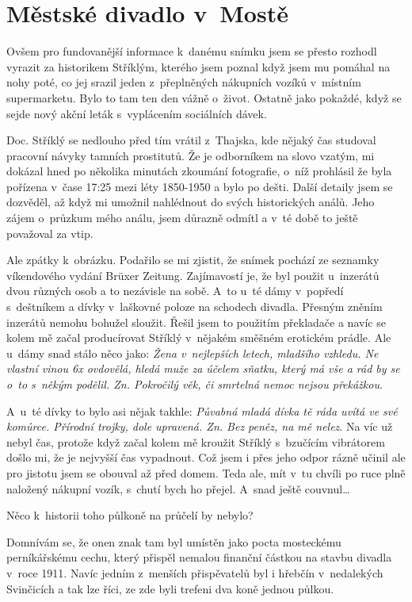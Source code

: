 
\chapter{Městské divadlo v~Mostě}

Ovšem pro fundovanější informace k~danému snímku jsem se přesto rozhodl vyrazit
za historikem Stříklým, kterého jsem poznal když jsem mu pomáhal na nohy poté,
co jej srazil jeden z~přeplněných nákupních vozíků v~místním supermarketu. Bylo
to tam ten den vážně o~život. Ostatně jako pokaždé, když se sejde nový akční
leták s~vyplácením sociálních dávek.

Doc. Stříklý se nedlouho před tím vrátil z~Thajska, kde nějaký čas studoval
pracovní návyky tamních prostitutů. Že je odborníkem na slovo vzatým, mi
dokázal hned po několika minutách zkoumání fotografie, o~níž prohlásil že byla
pořízena v~čase 17:25 mezi léty 1850-1950 a bylo po dešti. Další detaily jsem
se dozvěděl, až když mi umožnil nahlédnout do svých historických análů. Jeho
zájem o~průzkum mého análu, jsem důrazně odmítl a v~té době to ještě považoval
za vtip.

Ale zpátky k~obrázku. Podařilo se mi zjistit, že snímek pochází ze seznamky
víkendového vydání Brüxer Zeitung. Zajímavostí je, že byl použit u~inzerátů
dvou různých osob a to nezávisle na sobě. A~to u~té dámy v~popředí s~deštníkem
a dívky v~laškovné poloze na schodech divadla. Přesným zněním inzerátů nemohu
bohužel sloužit. Řešil jsem to použitím překladače a navíc se kolem mě začal
producírovat Stříklý v~nějakém směšném erotickém prádle. Ale u~dámy snad stálo
něco jako: {\em Žena v~nejlepších letech, mladšího vzhledu. Ne vlastní vinou 6x
ovdovělá, hledá muže za účelem sňatku, který má vše a rád by se o~to s~někým
podělil. Zn. Pokročilý věk, či smrtelná nemoc nejsou překážkou}.

A~u~té dívky to bylo asi nějak takhle: {\em Půvabná mladá dívka tě ráda uvítá
ve své komůrce. Přírodní trojky, dole upravená. Zn. Bez peněz, na mě nelez}. Na
víc už nebyl čas, protože když začal kolem mě kroužit Stříklý s~bzučícím
vibrátorem došlo mi, že je nejvyšší čas vypadnout. Což jsem i přes jeho odpor
rázně učinil ale pro jistotu jsem se obouval až před domem. Teda ale, mít v~tu
chvíli po ruce plně naložený nákupní vozík, s~chutí bych ho přejel. A~snad
ještě couvnul\dots{}

Něco k~historii toho půlkoně na průčelí by nebylo?

Domnívám se, že onen znak tam byl umístěn jako pocta mosteckému perníkářskému
cechu, který přispěl nemalou finanční částkou na stavbu divadla v~roce 1911.
Navíc jedním z~menších přispěvatelů byl i hřebčín v~nedalekých Svinčicích a tak
lze říci, ze zde byli trefeni dva koně jednou půlkou.


